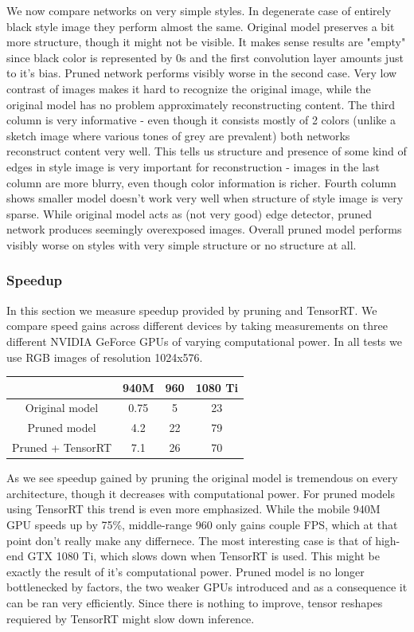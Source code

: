 \documentclass[../Main.tex]{subfiles}
\begin{document}
We now compare networks on very simple styles. In degenerate case of entirely black
style image they perform almost the same. Original model preserves a bit more 
structure, though it might not be visible. It makes sense results are "empty"
since black color is represented by $0$s and the first convolution layer amounts
just to it's bias. Pruned network performs visibly worse in the second case.
Very low contrast of images makes it hard to recognize the original image, while
the original model has no problem approximately reconstructing content. 
The third column is very informative - even though it consists mostly of 2 colors
(unlike a sketch image where various tones of grey are prevalent) both networks
reconstruct content very well. This tells us structure and presence of some kind
of edges in style image is very important for reconstruction - images in the last
column are more blurry, even though color information is richer.
Fourth column shows smaller model  doesn't work very well when structure of style 
image is very sparse. While original model acts as (not very good) edge detector,
pruned network produces seemingly overexposed images.
Overall pruned model performs visibly worse on styles with very simple structure or no
structure at all. 
\subsubsection{Speedup}
In this section we measure speedup provided by pruning and TensorRT. 
We compare speed gains across different devices by taking measurements on three different
NVIDIA GeForce GPUs of varying computational power. In all tests we use RGB images
of resolution 1024x576. 
\begin{table}
\begin{center}
\begin{tabular}{|c|c|c|c|}
\hline
                  &  940M & 960 & 1080 Ti \\
\hline
Original model    &  0.75 & 5   & 23 \\
\hline
Pruned model      &  4.2  & 22  & 79 \\
\hline
Pruned + TensorRT &  7.1  & 26  & 70 \\
\hline
\end{tabular}
\end{center}
\label{table:speedup}
\end{table}
As we see speedup gained by pruning the original model is tremendous on
every architecture, though it decreases with computational power.
For pruned models using TensorRT this trend is even more emphasized.
While the mobile 940M GPU speeds up by 75\%, middle-range 960 only gains
couple FPS, which at that point don't really make any differnece. The most
interesting case is that of high-end GTX 1080 Ti, which slows down
when TensorRT is used. This might be exactly the result of it's computational power.
Pruned model is no longer bottlenecked by factors, the two weaker GPUs
introduced and as a consequence it can be ran very efficiently.
Since there is nothing to improve, tensor reshapes requiered by TensorRT
might slow down inference.
\end{document}
